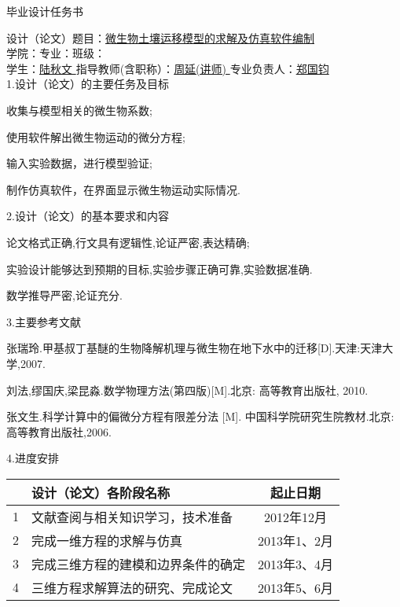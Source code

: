 \pagestyle{empty}
{\pagestyle{empty}
\begin{center}
\heiti 毕业设计任务书
\end{center}

\setlength{\baselineskip}{25pt}
\noindent 设计（论文）题目：\uline{\hfill 微生物土壤运移模型的求解及仿真软件编制 \hfill} \\
\noindent 学院：\uline{\qquad}\quad 专业：\uline{\quad}\quad 班级：\uline{\hfill} \\
\noindent 学生：\uline{\hfill 陆秋文 \hfill}\quad 指导教师(含职称）：\uline{\hfill 周延(讲师) \hfill} \quad 专业负责人：\uline{\hfill 郑国钧\hfill} \\
\noindent 1.设计（论文）的主要任务及目标\par
\begin{asparaenum}[(1)]
 \item 收集与模型相关的微生物系数;
 \item 使用软件解出微生物运动的微分方程;
 \item 输入实验数据，进行模型验证;
 \item 制作仿真软件，在界面显示微生物运动实际情况.
\end{asparaenum}
2.设计（论文）的基本要求和内容
\begin{asparaenum}[(1)]
 \item 论文格式正确,行文具有逻辑性,论证严密,表达精确;
 \item 实验设计能够达到预期的目标,实验步骤正确可靠,实验数据准确.
 \item 数学推导严密,论证充分.
\end{asparaenum}
3.主要参考文献
\begin{publist}
\item  张瑞玲.甲基叔丁基醚的生物降解机理与微生物在地下水中的迁移[D].天津:天津大学,2007.
\item  刘法,缪国庆,梁昆淼.数学物理方法(第四版)[M].北京: 高等教育出版社, 2010.
\item  张文生.科学计算中的偏微分方程有限差分法 [M]. 中国科学院研究生院教材.北京:高等教育出版社,2006.
\end{publist}
4.进度安排\vspace{\baselineskip}
\begin{center}
\begin{tabularx}{14cm}{|c|X|c|}
\hline
   & \centering 设计（论文）各阶段名称	& 起止日期 \\
\hline
 1 & 文献查阅与相关知识学习，技术准备   & 2012年12月 \\
\hline
 2 & 完成一维方程的求解与仿真          & 2013年1、2月 \\
 \hline
 3 & 完成三维方程的建模和边界条件的确定  & 2013年3、4月 \\
 \hline
 4 & 三维方程求解算法的研究、完成论文    & 2013年5、6月 \\
 \hline
\end{tabularx}
\end{center}
}
